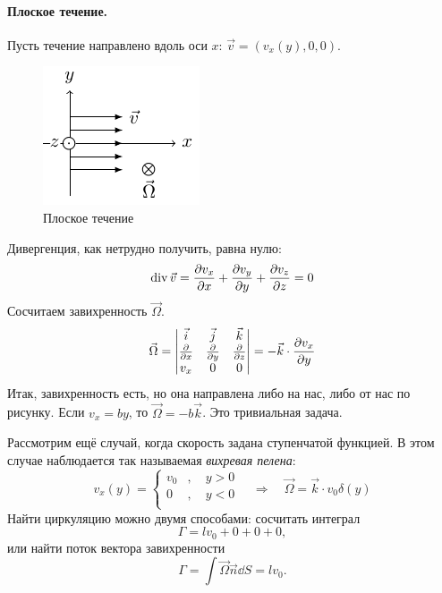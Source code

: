 \paragraph{Плоское течение.} Пусть течение направлено вдоль оси $x$: $\vec{v}=(v_x(y),0,0)$.
\begin{figure}[H]
    \centering
    \includegraphics[scale=1.5]{img/vxvyvz}
    \caption{Плоское течение}
    \label{fig:figure1}
\end{figure}
Дивергенция, как нетрудно получить, равна нулю:
\begin{equation}
	\operatorname{div}\vec{v}=\pdv{v_x}{x}+\pdv{v_y}{y}+\pdv{v_z}{z}=0
\end{equation}
Сосчитаем завихренность $\vec\Omega$.
\begin{equation}
	\vec{\Omega}=\mqty| %
		\vec{i}&\vec{j}&\vec{k}\\
		\pdv{x}&\pdv{y}&\pdv{z}\\
		v_x&0&0
	|=-\vec{k}\cdot\pdv{v_x}{y}
\end{equation}
Итак, завихренность есть, но она направлена либо на нас, либо от нас по рисунку. 
Если $v_x=b y$, то $ \vec{\Omega}=-b\vec{k}$. Это тривиальная задача.

 Рассмотрим ещё случай, когда скорость задана ступенчатой функцией. В этом случае наблюдается так называемая \textit{вихревая пелена}:
\begin{equation}
	v_x(y)=\left\{
	\begin{aligned}
		v_0&, \quad y>0\\
		0&, \quad y<0\\
	\end{aligned}
	\right.
	\quad\Rightarrow\quad
	\vec{\Omega}=\vec{k}\cdot v_0\delta(y)
\end{equation}
Найти циркуляцию можно двумя способами: сосчитать интеграл
\begin{equation}
	\Gamma=lv_0+0+0+0,
\end{equation}
или найти поток вектора завихренности
\begin{equation}
	\Gamma=\int \vec{\Omega}\vec{n}\dd S = lv_0.
\end{equation}

